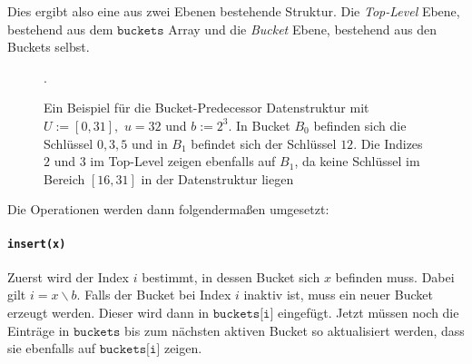 Dies ergibt also eine aus zwei Ebenen bestehende Struktur. Die \textit{Top-Level} Ebene, bestehend aus dem $\texttt{buckets}$ Array und die \textit{Bucket} Ebene, bestehend aus den Buckets selbst.

\begin{figure}[H]
	\centering
	\caption{Ein Beispiel für die Bucket-Predecessor Datenstruktur mit $U := [0, 31],$ $u = 32$ und $b := 2^3$. In Bucket $B_0$ befinden sich die Schlüssel $0, 3, 5$ und in $B_1$ befindet sich der Schlüssel $12$. Die Indizes $2$ und $3$ im Top-Level zeigen ebenfalls auf $B_1$, da keine Schlüssel im Bereich $[16, 31]$ in der Datenstruktur liegen}.
\end{figure}
Die Operationen werden dann folgendermaßen umgesetzt:

\paragraph{\texttt{insert(x)}}

Zuerst wird der Index $i$ bestimmt, in dessen Bucket sich $x$ befinden muss. Dabei gilt $i = x \backslash b$. Falls der Bucket bei Index $i$ inaktiv ist, muss ein neuer Bucket erzeugt werden. Dieser wird dann in $\texttt{buckets[i]}$ eingefügt.
Jetzt müssen noch die Einträge in $\texttt{buckets}$ bis zum nächsten aktiven Bucket so aktualisiert werden, dass sie ebenfalls auf $\texttt{buckets[i]}$ zeigen.

